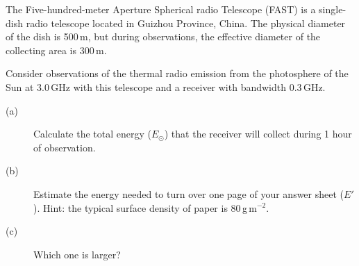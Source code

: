 The Five-hundred-meter Aperture Spherical radio Telescope (FAST) is a
single-dish radio telescope located in Guizhou Province, China. The physical
diameter of the dish is 500\,m, but during observations, the effective
diameter of the collecting area is 300\,m.

Consider observations of the thermal radio emission from the photosphere of
the Sun at 3.0\,GHz with this telescope and a receiver with bandwidth
0.3\,GHz.

\begin{description}
\item[(a)] Calculate the total energy ($E_\odot$) that the receiver will
  collect during 1 hour of observation.
\item[(b)] Estimate the energy needed to turn over one page of your answer
  sheet ($E'$). Hint: the typical surface density of paper is
  80\,g\,m$^{-2}$.
\item[(c)] Which one is larger?
\end{description}
